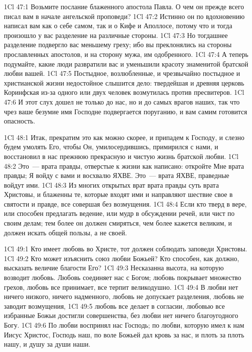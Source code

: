 \vs 1Cl 47:1
Возьмите послание
блаженного апостола Павла. О чем он прежде всего писал вам в начале ангельской
проповеди?
\vs 1Cl 47:2
Истинно он по вдохновению
написал вам как о себе самом, так и о Кифе и Аполлосе, потому что и тогда
произошло у вас разделение на различные стороны.
\vs 1Cl 47:3
Но тогдашнее разделение
подвергло вас меньшему греху; ибо вы преклонялись на стороны прославленных
апостолов, и на сторону мужа, им одобренного.
\vs 1Cl 47:4
А теперь подумайте, какие
люди развратили вас и уменьшили красоту знаменитой братской любви вашей.
\vs 1Cl 47:5
Постыдное, возлюбленные, и
чрезвычайно постыдное и христианской жизни недостойное слышится дело:
твердейшая и древняя церковь Коринфская из-за одного или двух человек
возмутилась против пресвитеров.
\vs 1Cl 47:6
И этот слух дошел не
только до нас, но и до самых врагов наших, так что чрез ваше безумие имя
Господне подвергается поруганию, и вам самим готовится опасность.

\vs 1Cl 48:1
Итак, прекратим это как
можно скорее, и припадем к Господу, и слезно будем умолять Его, чтобы Он,
умилосердившись, примирился с нами, и восстановил в нас прежнюю прекрасную и
чистую жизнь братской любви.
\vs 1Cl 48:2
Это~--- врата правды,
отверстые к жизни как написано: откройте Мне врата правды; Я войду с вами и
восхвалю ЯХВЕ. Это~--- врата ЯХВЕ, праведные войдут ими.
\vs 1Cl 48:3
Из многих открытых врат
врата правды суть врата Христовы, и блаженны те, которые входят ими и
направляют шествие свое в святости и правде, все совершая без возмущения.
\vs 1Cl 48:4
Если кто тверд в вере, или
способен предлагать ведение, или мудр в обсуждении речей, или чист по своим
делам; тем более он должен смиряться, чем более кажется великим, и должен
искать общей пользы, а не своей.

\vs 1Cl 49:1
Кто имеет любовь во
Христе, тот должен соблюдать заповеди Христовы.
\vs 1Cl 49:2
Кто может изъяснить союз
любви Божьей? Кто способен, как должно, высказать величие благости Его?
\vs 1Cl 49:3
Несказанна высота, на
которую возводит любовь. Любовь соединяет нас с Богом; любовь покрывает
множество грехов, любовь все принимает, все терпит великодушно.
\vs 1Cl 49:4
В любви нет ничего
низкого, ничего надменного, любовь не допускает разделения, любовь не заводит
возмущения,
\vs 1Cl 49:5
любовь все делает в
согласии, любовью все избранные Божьи достигли совершенства, без любви нет
ничего благоугодного Богу.
\vs 1Cl 49:6
По любви воспринял нас
Господь; по любви, которую имел к нам Иисус Христос, Господь наш, по воле
Божьей дал кровь за нас, и плоть за плоть нашу, и душу за души наши.

